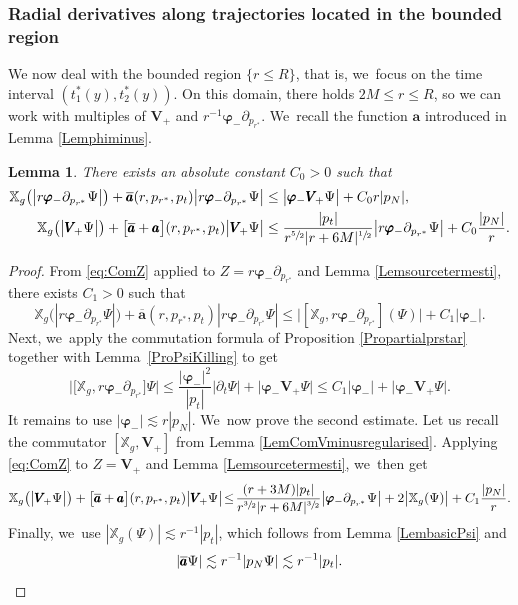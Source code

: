 \documentclass[10pt]{amsart}
\theoremstyle{plain}
\newtheorem{lemma}[proposition]{Lemma}
\theoremstyle{definition}
\newcommand\T{{\mathbb{X}}}
\begin{document}
\subsubsection{Radial derivatives along trajectories located in the bounded region}
We now deal with the bounded region $\{ r \leq R \}$, that is, we~focus on the time interval $(t_1^*(y),t_2^*(y))$. On this domain, there holds $2M \leq r \leq R$, so we can work with multiples of $\pmb{V}_{\! +}$ and $ r^{-1}\pmb{\varphi}_- \partial_{p_{r^*}}$. We~recall the function $\pmb{a}$ introduced in Lemma \ref{Lemphiminus}.
\begin{lemma}\label{LemComPsi00}
There exists an absolute constant $C_0 >0$ such that
\begin{align*}
\T_g \bigl(\big| r \pmb{\varphi}_- \partial_{p_{r^*}} \Psi \big| \bigr) +\overline{\pmb{a}} (r,p_{r^*},p_t) \big| r \pmb{\varphi}_- \partial_{p_{r^*}} \Psi \big| & \leq \big|\pmb{\varphi}_- \pmb{V}_{\! +} \Psi \big|+C_0r|p_N|, \\
\T_g \bigl(\big| \pmb{V}_{\! +} \Psi \big| \bigr) + \bigl[\overline{\pmb{a}}+\pmb{a} \bigr](r,p_{r^*},p_t) \big| \pmb{V}_{\! +} \Psi \big| & \leq \frac{|p_t|}{r^{\sfrac{5}{2}}|r+6M|^{\sfrac{1}{2}}}\big| r \pmb{\varphi}_- \partial_{p_{r^*}}\Psi \big|+C_0\frac{|p_N|}{r}.
\end{align*}
\end{lemma}

\begin{proof}
From \eqref{eq:ComZ} applied to $Z=r \pmb{\varphi}_- \partial_{p_{r^*}}$ and Lemma \ref{Lemsourcetermesti}, there exists $C_1>0$ such that
\begin{equation*}\label{eq:Psi1}
\T_g \bigl(| r \pmb{\varphi}_- \partial_{p_{r^*}} \Psi | \bigr) + \overline{\pmb{a}} (r,p_{r^*},p_t) | r \pmb{\varphi}_- \partial_{p_{r^*}} \Psi | \leq \big|[\T_g, r \pmb{\varphi}_- \partial_{p_{r^*}} ](\Psi) \big|+C_1|\pmb{\varphi}_-|.
\end{equation*}
Next, we~apply the commutation formula of Proposition \ref{Propartialprstar} together with Lem\-ma~\ref{ProPsiKilling} to get
\[
\big| \bigl[\T_g, r \pmb{\varphi}_- \partial_{p_{r^*}} \bigr]\Psi \big| \leq \frac{|\pmb{\varphi}_-|^2}{ |p_t| }\big| \partial_t \Psi \big| + \big|\pmb{\varphi}_- \pmb{V}_{\! +} \Psi \big| \leq C_1|\pmb{\varphi}_-| + \big|\pmb{\varphi}_- \pmb{V}_{\! +} \Psi \big|.
\]
It remains to use $|\pmb{\varphi}_-| \lesssim r|p_N|$. We~now prove the second estimate. Let us recall the commutator $[\T_g,\pmb{V}_{\! +}]$ from Lemma \ref{LemComVminusregularised}. Applying \eqref{eq:ComZ} to $Z=\pmb{V}_{\! +}$ and Lemma \ref{Lemsourcetermesti}, we~then get
\[
\T_g \bigl(\big| \pmb{V}_{\! +} \Psi \big| \bigr) + \bigl[ \overline{\pmb{a}}+\pmb{a}\bigr](r,p_{r^*},p_t) \big| \pmb{V}_{\! +} \Psi \big| \!\leq\! \frac{(r+3M)|p_t|}{r^{\sfrac{3}{2}}|r+6M|^{\sfrac{3}{2}}}\big| \pmb{\varphi}_- \partial_{p_{r^*}} \Psi \big| +2\big| \T_g (\Psi) \big|+C_1\frac{|p_N|}{r }.
\]
Finally, we~use $|\T_g(\Psi)|\lesssim r^{-1}|p_t| $, which follows from Lemma \ref{LembasicPsi} and
\[|\overline{\pmb{a}} \Psi| \lesssim r^{-1}|p_N \Psi| \lesssim r^{-1} |p_t|.\qedhere
\]
\end{proof}
\end{document}
